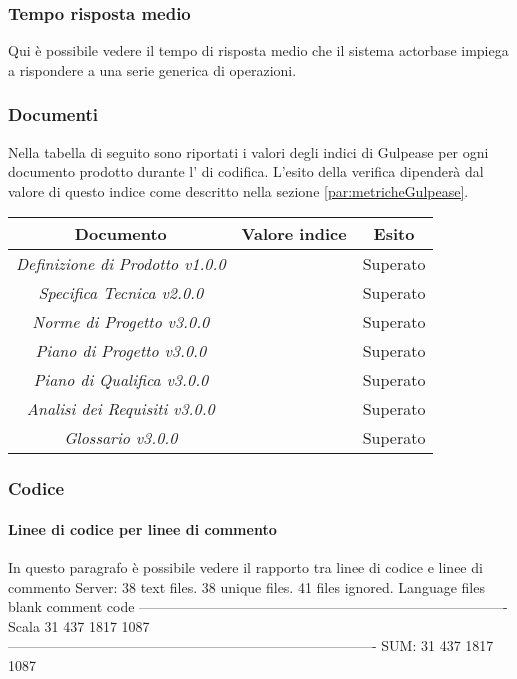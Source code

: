 \documentclass{scalatekids-article}
\begin{document}
\subsubsection{Tempo risposta medio} %
Qui è possibile vedere il tempo di risposta medio che il sistema actorbase 
impiega a rispondere a una serie generica di operazioni.\\

\subsubsection{Documenti}
Nella tabella di seguito sono riportati i valori degli indici di Gulpease per ogni documento prodotto durante l' di codifica. L'esito della verifica dipenderà dal valore di questo indice come descritto nella sezione \ref{par:metricheGulpease}.
\begin{center}
  \begin{tabular}{| c | c | c |}
    \hline
    Documento & Valore indice & Esito\\
    \hline
    \textit{Definizione di Prodotto v1.0.0} & & Superato\\
    \textit{Specifica Tecnica v2.0.0} &  & Superato\\
    \textit{Norme di Progetto v3.0.0} &  & Superato\\
    \textit{Piano di Progetto v3.0.0} &  & Superato\\
    \textit{Piano di Qualifica v3.0.0} &  & Superato\\
    \textit{Analisi dei Requisiti v3.0.0} &  & Superato\\
    \textit{Glossario v3.0.0} &  & Superato\\ %
    \hline
  \end{tabular}
\end{center}

\subsubsection{Codice}

\paragraph{Linee di codice per linee di commento}
In questo paragrafo è possibile vedere il rapporto tra linee di codice e 
linee di commento
Server:
      38 text files.
      38 unique files.
      41 files ignored.
      Language                     files          blank        comment           code
      -------------------------------------------------------------------------------
      Scala                           31            437           1817           1087
      -------------------------------------------------------------------------------
      SUM:                            31            437           1817           1087
      
\end{document}
